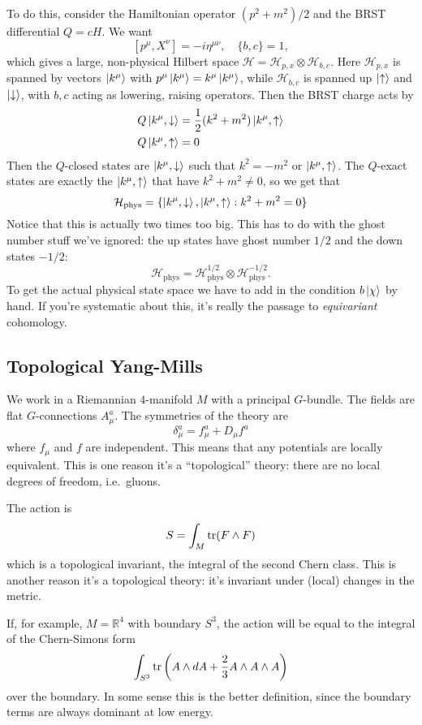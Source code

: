 To do this, consider the Hamiltonian operator $(p^2 + m^2)/2$ and the BRST differential $Q = cH$.
We want
\[
[p^\mu, X^\nu] = - i \eta^{\mu \nu}, \quad \{ b, c\} =1,
\]
which gives a large, non-physical Hilbert space $\mathcal H = \mathcal H_{p,x} \otimes \mathcal H_{b,c}$.
Here $\mathcal H_{p,x}$ is spanned by vectors $\left | k^\mu \right \rangle$ with $p^\mu \left | k^\mu \right \rangle = k^\mu \left | k^\mu \right \rangle$, while $\mathcal H_{b,c}$ is spanned up $\left | \uparrow \right \rangle$ and $\left | \downarrow \right \rangle$, with $b,c$  acting as lowering, raising operators.
Then the BRST charge acts by
\begin{align*}
Q \left | k^\mu, \downarrow \right \rangle &= \frac{1}{2} (k^2 + m^2) \left | k^\mu, \uparrow \right \rangle\\
Q \left | k^\mu, \uparrow \right \rangle &= 0
\end{align*}
Then the $Q$-closed states are $\left | k^\mu, \downarrow \right \rangle$ such that $k^2  = -m^2$ or $\left | k^\mu, \uparrow \right \rangle$.
The $Q$-exact states are exactly the $\left | k^\mu, \uparrow \right \rangle$ that have $k^2 + m^2 \ne 0$, so we get that
\[
\mathcal H_{\text{phys}} = \{\left | k^\mu, \downarrow \right \rangle, \left | k^\mu, \uparrow \right \rangle : k^2 + m^2 = 0 \}
\]
Notice that this is actually two times too big.
This has to do with the ghost number stuff we've ignored: the up states have ghost number $1/2$ and the down states $-1/2$:
\[
\mathcal H_{\text{phys}} = \mathcal H_{\text{phys}}^{1/2} \otimes \mathcal H_{\text{phys}}^{-1/2}.
\]
To get the actual physical state space we have to add in the condition $b \left | \chi \right \rangle$ by hand.
If you're systematic about this, it's really the passage to \emph{equivariant} cohomology.

\subsection*{Topological Yang-Mills}
We work in a Riemannian $4$-manifold $M$ with a principal $G$-bundle.
The fields are flat $G$-connections $A_\mu^a$.
The symmetries of the theory are
\[
\delta_\mu^a = f_\mu^a + D_\mu f^a
\]
where $f_\mu$ and $f$ are independent.
This means that any potentials are locally equivalent.
This is one reason it's a ``topological'' theory: there are no local degrees of freedom, i.e.~gluons.

The action is
\[
S = \int_M \operatorname{tr}(F \wedge F)
\]
which is a topological invariant, the integral of the second Chern class.
This is another reason it's a topological theory: it's invariant under (local) changes in the metric.

If, for example, $M = \mathbb R^4$ with boundary $S^3$, the action will be equal to the integral of the Chern-Simons form
\[
\int_{S^3} \operatorname{tr}\left(A \wedge dA + \frac{2}{3} A \wedge A \wedge A \right)
\]
over the boundary.
In some sense this is the better definition, since the boundary terms are always dominant at low energy.

